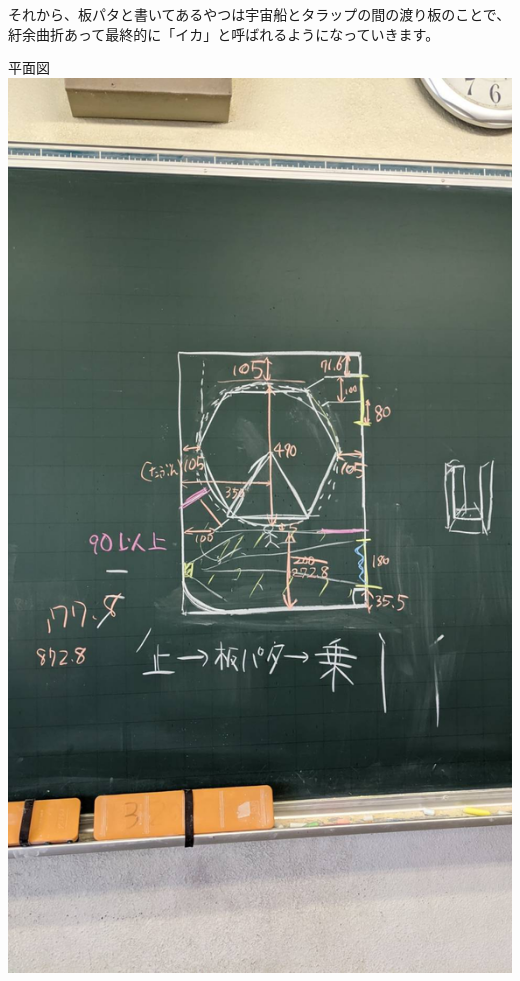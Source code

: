 \documentclass[uplatex,dvipdfmx]{jsarticle}
\begin{document}
それから、板パタと書いてあるやつは宇宙船とタラップの間の渡り板のことで、紆余曲折あって最終的に「イカ」と呼ばれるようになっていきます。

\begin{imageHere}{平面図}
    \includegraphics[width=0.45\linewidth]{images/plan/69138.jpg}
\end{imageHere}
\end{document}

